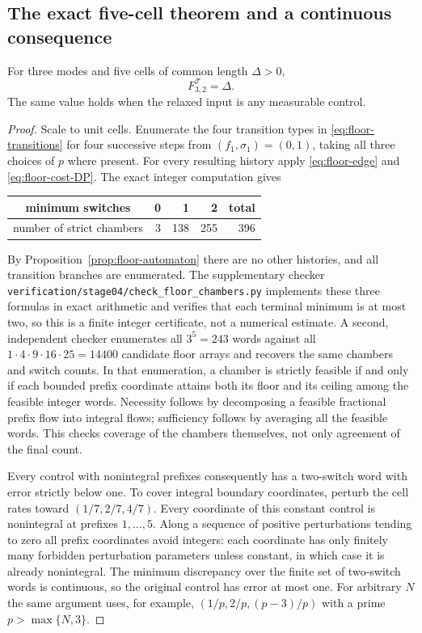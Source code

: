 \subsection{The exact five-cell theorem and a continuous consequence}
\begin{theorem}\label{thm:five-cells}
For three modes and five cells of common length $\Delta>0$,
\begin{equation}\label{eq:five-cells}
 F^{\mathcal T}_{3,2}=\Delta.
\end{equation}
The same value holds when the relaxed input is any measurable control.
\end{theorem}
\begin{proof}
Scale to unit cells. Enumerate the four transition types in
\eqref{eq:floor-transitions} for four successive steps from
$(f_1,\sigma_1)=(0,1)$, taking all three choices of $p$ where present.
For every resulting history apply \eqref{eq:floor-edge} and
\eqref{eq:floor-cost-DP}. The exact integer computation gives
\begin{center}
\begin{tabular}{c|rrr|r}
minimum switches&0&1&2&total\\\hline
number of strict chambers&3&138&255&396
\end{tabular}
\end{center}
By Proposition~\ref{prop:floor-automaton} there are no other histories,
and all transition branches are enumerated. The supplementary checker
\texttt{verification/stage04/check\_floor\_chambers.py} implements these
three formulas in exact arithmetic and verifies that each terminal
minimum is at most two, so this is a finite integer certificate, not a
numerical estimate.
A second, independent checker enumerates all $3^5=243$ words against
all $1\cdot4\cdot9\cdot16\cdot25=14400$ candidate floor arrays and
recovers the same chambers and switch counts.
In that enumeration, a chamber is strictly feasible if and only if each
bounded prefix coordinate attains both its floor and its ceiling among the
feasible integer words. Necessity follows by decomposing a feasible
fractional prefix flow into integral flows; sufficiency follows by averaging
all the feasible words. This checks coverage of the chambers themselves,
not only agreement of the final count.

Every control with nonintegral prefixes consequently has a two-switch
word with error strictly below one. To cover integral boundary coordinates,
perturb the cell rates toward $(1/7,2/7,4/7)$. Every coordinate of this
constant control is nonintegral at prefixes $1,\ldots,5$. Along a sequence
of positive perturbations tending to zero all prefix coordinates avoid
integers: each coordinate has only finitely many forbidden perturbation
parameters unless constant, in which case it is already nonintegral.
The minimum discrepancy over the finite set of two-switch words is
continuous, so the original control has error at most one.
For arbitrary $N$ the same argument uses, for example,
$(1/p,2/p,(p-3)/p)$ with a prime $p>\max\{N,3\}$.


\end{proof}
